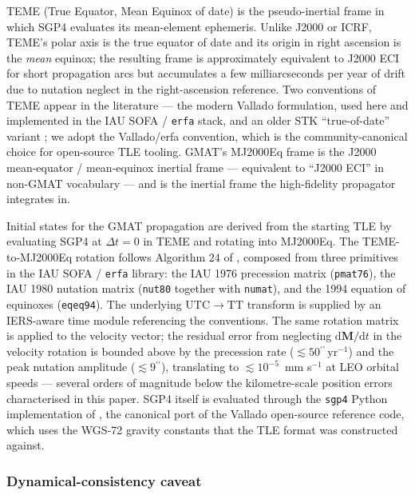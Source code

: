 \documentclass[10pt, letterpaper]{article}
\begin{document}
TEME (True Equator, Mean Equinox of date) is the pseudo-inertial
frame in which SGP4 evaluates its mean-element ephemeris. Unlike
J2000 or ICRF, TEME's polar axis is the true equator of date and
its origin in right ascension is the \emph{mean} equinox; the
resulting frame is approximately equivalent to J2000 ECI for short
propagation arcs but accumulates a few milliarcseconds per year of
drift due to nutation neglect in the right-ascension reference.
Two conventions of TEME appear in the literature --- the modern
Vallado formulation, used here and implemented in the IAU SOFA /
\texttt{erfa} stack, and an older STK ``true-of-date'' variant
\citep[\S\,3.7]{vallado2013}; we adopt the Vallado/erfa convention,
which is the community-canonical choice for open-source TLE
tooling. GMAT's MJ2000Eq frame is the J2000 mean-equator /
mean-equinox inertial frame --- equivalent to ``J2000 ECI'' in
non-GMAT vocabulary --- and is the inertial frame the
high-fidelity propagator integrates in.

Initial states for the GMAT propagation are derived from the starting
TLE by evaluating SGP4 at $\Delta t = 0$ in TEME and rotating into
MJ2000Eq. The TEME-to-MJ2000Eq rotation follows
Algorithm 24 of \citet{vallado2013}, composed from three primitives
in the IAU SOFA / \texttt{erfa} library: the IAU 1976 precession
matrix (\texttt{pmat76}), the IAU 1980 nutation matrix
(\texttt{nut80} together with \texttt{numat}), and the 1994 equation
of equinoxes (\texttt{eqeq94}). The underlying $\mathrm{UTC}\to
\mathrm{TT}$ transform is supplied by an IERS-aware time module
referencing the \citet{iers2010} conventions. The same rotation
matrix is applied to the velocity vector; the residual error from
neglecting $\mathrm{d}\mathbf{M}/\mathrm{d}t$ in the velocity rotation
is bounded above by the precession rate
($\lesssim 50{}^{\prime\prime}\,\mathrm{yr}^{-1}$) and the peak
nutation amplitude ($\lesssim 9{}^{\prime\prime}$), translating to
$\lesssim 10^{-5}$~mm
s$^{-1}$ at LEO orbital speeds --- several orders of magnitude below
the kilometre-scale position errors characterised in this paper.
SGP4 itself is evaluated through the \texttt{sgp4} Python
implementation of \citet{rhodes_sgp4}, the canonical port of the
Vallado open-source reference code, which uses the WGS-72 gravity
constants that the TLE format was constructed against.

\subsubsection{Dynamical-consistency caveat}
\label{sec:methods-dynamical-consistency}
\end{document}
